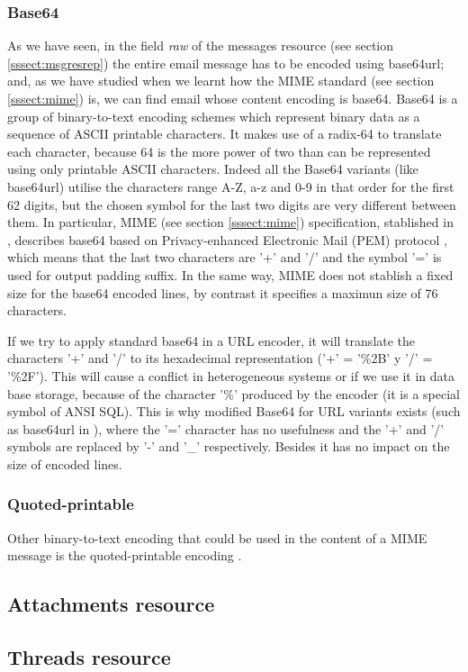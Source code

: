 \subsubsection{Base64} \label{sssect:base64}
As we have seen, in the field \textit{raw} of the messages resource (see section \ref{sssect:msgresrep}) the entire email message has to be encoded using base64url; and, as we have studied when we learnt how the MIME standard (see section \ref{sssect:mime}) is, we can find email whose content encoding is base64. Base64 \citep{wikibase64} is a group of binary-to-text encoding schemes which represent binary data as a sequence of ASCII printable characters. It makes use of a radix-64 to translate each character, because 64 is the more power of two than can be represented using only printable ASCII characters. Indeed all the Base64 variants (like base64url) utilise the characters range A-Z, a-z and 0-9 in that order for the first 62 digits, but the chosen symbol for the last two digits are very different between them. In particular, MIME (see section \ref{sssect:mime}) specification, stablished in \cite{rfc2045}, describes base64 based on  Privacy-enhanced Electronic Mail (PEM) protocol \citep{wikipem}, which means that the last two characters are '+' and '/' and the symbol '=' is used for output padding suffix. In the same way, MIME does not stablish a fixed size for the base64 encoded lines, by contrast it specifies a maximun size of 76 characters.

If we try to apply standard base64 in a URL encoder, it will translate the characters '+' and '/' to its hexadecimal representation ('+' = '\%2B' y '/' = '\%2F'). This will cause a conflict in heterogeneous systems or if we use it in data base storage, because of the character '\%' produced by the encoder (it is a special symbol of ANSI SQL). This is why modified Base64 for URL variants exists (such as base64url in \cite{rfc4648}), where the '=' character has no usefulness and the '+' and '/' symbols are replaced by '-' and '\_' respectively. Besides it has no impact on the size of encoded lines.

\subsubsection{Quoted-printable} \label{sssect:quot-p}
Other binary-to-text encoding that could be used in the content of a MIME message is the quoted-printable encoding \citep{wikiquotprint}.

\subsection{Attachments resource} \label{ssect:attres}

\subsection{Threads resource}\label{ssect:threads}

